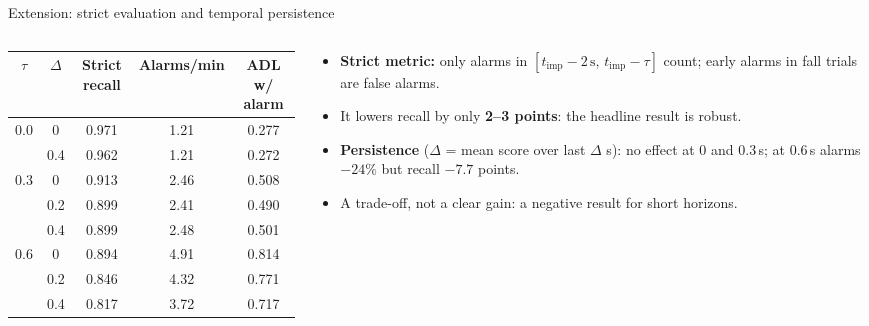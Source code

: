 \documentclass[aspectratio=169,11pt]{beamer}
\begin{document}
\begin{frame}{Extension: strict evaluation and temporal persistence}
\begin{columns}[T]
\begin{column}{0.54\textwidth}
\footnotesize
\begin{tabular}{ccccc}
\toprule
$\tau$ & $\Delta$ & Strict recall & Alarms/min & ADL w/ alarm\\
\midrule
0.0 & 0 & 0.971 & 1.21 & 0.277\\
 & 0.4 & 0.962 & 1.21 & 0.272\\
\midrule
0.3 & 0 & 0.913 & 2.46 & 0.508\\
 & 0.2 & 0.899 & 2.41 & 0.490\\
 & 0.4 & 0.899 & 2.48 & 0.501\\
\midrule
0.6 & 0 & 0.894 & 4.91 & 0.814\\
 & 0.2 & 0.846 & 4.32 & 0.771\\
 & 0.4 & \alert{0.817} & \alert{3.72} & 0.717\\
\bottomrule
\end{tabular}
\end{column}
\begin{column}{0.44\textwidth}
\small
\begin{itemize}\setlength\itemsep{0.5em}
\item \textbf{Strict metric:} only alarms in $[t_{\mathrm{imp}}-2\,\mathrm{s},\,t_{\mathrm{imp}}-\tau]$ count; early alarms in fall trials are false alarms.
\item It lowers recall by only \textbf{2--3 points}: the headline result is robust.
\item \textbf{Persistence} ($\Delta$ = mean score over last $\Delta$ s): no effect at 0 and 0.3\,s; at 0.6\,s alarms $-24\%$ but recall $-7.7$ points.
\item A trade-off, not a clear gain: a negative result for short horizons.
\end{itemize}
\end{column}
\end{columns}
\end{frame}
\end{document}
